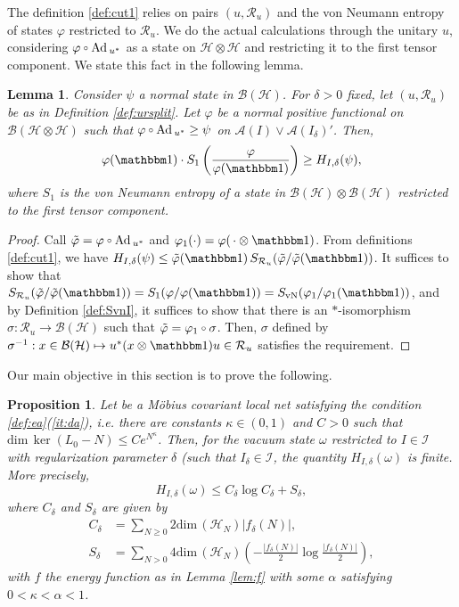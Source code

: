 \documentclass[a4paper,12pt]{article}
\theoremstyle{plain}
\newtheorem{lemm}[theo]{Lemma}
\newtheorem{prop}[theo]{Proposition}
\theoremstyle{definition}
\theoremstyle{remark}
\newcommand{\compcent}[1]{\vcenter{\hbox{$#1\circ$}}}
\newcommand{\comp}{\mathbin{\mathchoice
{\compcent\scriptstyle}{\compcent\scriptstyle}
{\compcent\scriptscriptstyle}{\compcent\scriptscriptstyle}}}
\newcommand{\Svn}{S_{\rm vN}}
\def\A{{\mathcal A}}
\def\B{{\mathcal B}}
\def\H{{\mathcal H}}
\def\R{{\mathcal R}}
\def\R{{\mathcal R}}
\def\s{\sigma}
\def\Ad{{\hbox{\rm Ad\,}}}
\def\dim{\mathrm{dim}\,}
\def\1{{\mathbbm 1}}
\begin{document}
The definition \ref{def:cut1} relies on pairs $(u,\R_u)$ and the von Neumann entropy of states $\varphi$ restricted to $\R_u$.
We do the actual calculations through the unitary $u$, considering $\varphi\comp\Ad_{u^*}$ as a state on $\H\otimes\H$
and restricting it to the first tensor component. We state this fact in the following lemma.

\begin{lemm}\label{lem:hh} Consider $\psi$ a normal state in $\B(\H)$. For $\delta>0$ fixed, let $(u,\R_u)$ be as in Definition \ref{def:ursplit}. Let $\varphi$ be a normal positive functional on $\B(\H\otimes\H)$ such that $\varphi\comp \Ad_{u^*} \ge \psi$ on $\A(I)\vee\A(I_\delta)'$. Then,
  \[ \varphi(\1) \cdot S_1\left(\frac{\varphi}{\varphi(\1)}\right) \ge H_{I,\delta}(\psi)  ,\]
  where  $S_1$ is the von Neumann entropy of a state in $\B(\H) \otimes \B(\H)$ restricted to the first tensor component.
  \end{lemm}

\begin{proof}
  Call $\tilde{\varphi} = \varphi\comp\Ad_{u^*}$ and $\varphi_1(\cdot)=\varphi(\,\cdot\otimes \1)$.
  From definitions \ref{def:cut1}, we have $H_{I,\delta}(\psi) \le \tilde{\varphi}(\1) \, S_{\R_u}(\tilde{\varphi}/\tilde{\varphi}(\1))$.
  It suffices to show that $S_{\R_u}(\tilde{\varphi}/\tilde{\varphi}(\1)) = S_1(\varphi/\varphi(\1)) = \Svn(\varphi_1/\varphi_1(\1))$, and by Definition \ref{def:SvnI}, it suffices to show that there is an $*$-isomorphism $\s: \R_u \to \B(\H)$ such that $\tilde{\varphi} = \varphi_1\comp \s$. Then, $\s$ defined by $\s^{-1}: x\in\B(\H) \mapsto u^*(x\otimes \1)u \in \R_u$ satisfies the requirement.
\end{proof}

Our main objective in this section is to prove the following.

\begin{prop}\label{pro:cut1} Let be a M\"obius covariant local net satisfying the condition \ref{def:ea}(\ref{it:da}), \textit{i.e.}\! there are constants $\kappa \in (0,1)$ and $C>0$ such that $\dim\ker(L_0-N)\le Ce^{N^\kappa}$.
Then, for the vacuum state $\omega$ restricted to $I\in\mathcal{I}$ with regularization parameter $\delta$ (such that $I_\delta\in\mathcal{I}$,
the quantity $H_{I,\delta}(\omega)$ is finite. More precisely,
\[
 H_{I,\delta}(\omega) \le C_\delta\log C_\delta + S_\delta,
\]
where $C_\delta$ and $S_\delta$ are given by
\begin{align*}
  C_\delta &= \sum_{N\ge 0} 2 \dim(\H_N) |f_\delta(N)|,\\
  S_\delta &= \sum_{N > 0} 4 \dim(\H_N) \left(-\frac{\left|f_\delta(N)\right|}2\log\frac{\left|f_\delta(N)\right|}2\right),
\end{align*}
with $f$ the energy function as in Lemma \ref{lem:f} with some $\alpha$ satisfying $0<\kappa<\alpha<1$.
\end{prop}
\end{document}
